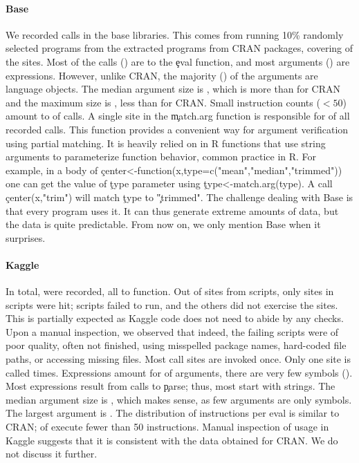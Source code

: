 \documentclass[review,screen,acmsmall,anonymous=true]{acmart}
\begin{document}
\paragraph{Base}\label{sec:usage-base}

We recorded \baseAllcalls \eval calls in the \BasePackages base libraries. This
comes from running 10\% randomly selected programs from the
\CranRunnableScriptsRnd extracted programs from CRAN packages, covering
\baseTriggeredevalpct of the \BaseEvalCallSites sites. Most of the calls
(\baseEvalsratio) are to the \c{eval} function, and most arguments
(\baseCodepercent) are expressions. However, unlike CRAN, the majority
(\baseLanguagepercent) of the arguments are language objects. The median
argument size is \baseMedianszeval, which is more than for CRAN and the maximum
size is \baseMaxszeval, less than for CRAN. Small instruction counts ($<50$)
amount to \baseSmalleventspct of calls. A single site in the \c{match.arg}
function is responsible for \baseTopFuncPercent of all recorded calls. This
function provides a convenient way for argument verification using partial
matching. It is heavily relied on in R functions that use string arguments to
parameterize function behavior, common practice in R. For example, in a body of
\c{center<-function(x,type=c("mean","median","trimmed"))} one can get the
value of \c{type} parameter using \c{type<-match.arg(type)}. A call
\c{center(x,"trim")} will match \c{type} to \c{"trimmed"}. The challenge
dealing with Base is that every program uses it. It can thus generate extreme
amounts of data, but the data is quite predictable. From now on, we only mention
Base when it surprises.


\paragraph{Kaggle}

In total, \kaggleAllcalls \eval were recorded, all to \eval function. Out of
\kaggleStaticeval sites from \KaggleWithEvals scripts, only \kaggleTriggeredeval
sites in \kaggleNbruns scripts were hit; \KaggleFailedScripts scripts failed to
run, and the others did not exercise the \eval sites. This is partially expected
as Kaggle code does not need to abide by any checks. Upon a manual inspection,
we observed that indeed, the failing scripts were of poor quality, often not
finished, using misspelled package names, hard-coded file paths, or accessing
missing files. Most call sites are invoked once. Only one site is called
\kaggleMaxcalls times. Expressions amount for \kaggleCodepercent of arguments,
there are very few symbols (\kaggleSymbolpercent). Most expressions result from
calls to \c{parse}; thus, most \evals start with strings. The median argument
size is \kaggleMedianszeval, which makes sense, as few arguments are only
symbols. The largest argument is \kaggleMaxszeval. The distribution of
instructions per eval is similar to CRAN; \kaggleSmalleventspct of \evals
execute fewer than 50 instructions. Manual inspection of \eval usage in Kaggle
suggests that it is consistent with the data obtained for CRAN. We do not
discuss it further.
\end{document}
